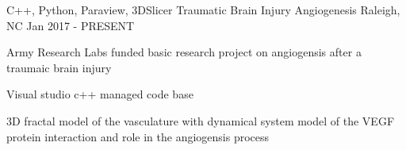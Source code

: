 \begin{cventries}
  \cventry
    {C++, Python, Paraview, 3DSlicer} %
    {Traumatic Brain Injury Angiogenesis } %
    {Raleigh, NC} %
    {Jan 2017 - PRESENT} %
    {
      \begin{cvitems} %
        \item {Army Research Labs funded basic research project on angiogensis after a traumaic brain injury}
        \item {Visual studio c++ managed code base}
        \item {3D fractal model of the vasculature with dynamical system model of the VEGF protein interaction and role in the angiogensis process}
      \end{cvitems}
    }
\end{cventries}
\pagebreak
